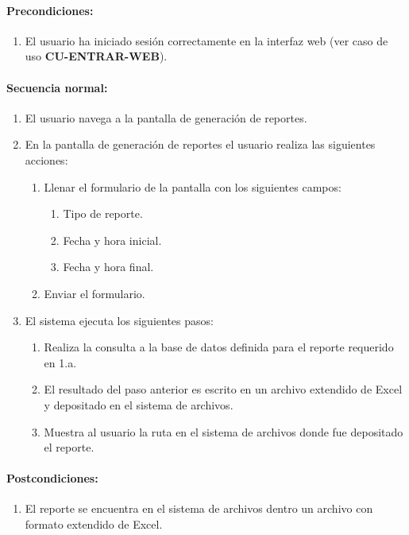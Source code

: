 \paragraph{Precondiciones:}
\begin{enumerate}
  \item El usuario ha iniciado sesión correctamente en la interfaz web (ver caso de uso \textbf{CU-ENTRAR-WEB}).
\end{enumerate}
\paragraph{Secuencia normal:}
\begin{enumerate}
  \item El usuario navega a la pantalla de generación de reportes.
  \item En la pantalla de generación de reportes el usuario realiza las siguientes acciones:
    \begin{enumerate}
    \item Llenar el formulario de la pantalla con los siguientes campos:
    \begin{enumerate}
      \item Tipo de reporte.
      \item Fecha y hora inicial.
      \item Fecha y hora final.
    \end{enumerate}
    \item Enviar el formulario.
  \end{enumerate}
  \item El sistema ejecuta los siguientes pasos:
  \begin{enumerate}
    \item Realiza la consulta a la base de datos definida para el reporte requerido en 1.a.
    \item El resultado del paso anterior es escrito en un archivo extendido de Excel\textsuperscript{\textcopyright} y depositado en el sistema de archivos.
    \item Muestra al usuario la ruta en el sistema de archivos donde fue depositado el reporte.
  \end{enumerate}
\end{enumerate}
\paragraph{Postcondiciones:}
\begin{enumerate}
  \item El reporte se encuentra en el sistema de archivos dentro un archivo con formato extendido de Excel\textsuperscript{\textcopyright}.
\end{enumerate}
